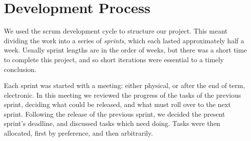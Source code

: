 \section{Development Process}

We used the scrum development cycle to structure our project.
This meant dividing the work into a series of \emph{sprints}, which each lasted approximately half a week.
Usually sprint lengths are in the order of weeks, but there was a short time to complete this project, and so short iterations were essential to a timely conclusion.

Each sprint was started with a meeting: either physical, or after the end of term, electronic.
In this meeting we reviewed the progress of the tasks of the previous sprint, deciding what could be released, and what must roll over to the next sprint.
Following the release of the previous sprint, we decided the present sprint's deadline, and discussed tasks which need doing.
Tasks were then allocated, first by preference, and then arbitrarily.
